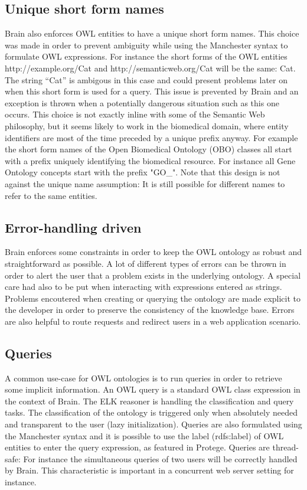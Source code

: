 \documentclass{llncs}
\begin{document}
\subsection{Unique short form names}
Brain also enforces OWL entities to have a unique short form names. This choice was made in order to prevent ambiguity while using 
the Manchester syntax to formulate OWL expressions. For instance the short forms of the OWL entities http://example.org/Cat and
http://semanticweb.org/Cat will be the same: Cat. The string ``Cat'' is ambigous in this case and could present problems later on when this
short form is used for a query.
This issue is prevented by Brain and an exception is thrown 
when a potentially dangerous situation such as this one occurs. 
This choice is not exactly inline with some of the Semantic Web philosophy, but it
seems likely to work in the biomedical domain, where entity identifiers are most of the time preceded by a unique prefix anyway. For example
the short form names of the Open Biomedical Ontology (OBO) classes all start with a prefix uniquely identifying the biomedical resource.
For instance all Gene Ontology concepts start with the prefix "GO\_".
Note that this design is not against the unique name assumption: It is still possible for different names to refer to the same entities.

\subsection{Error-handling driven}
Brain enforces some constraints in order to keep the OWL ontology as robust and straightforward as possible. 
A lot of different types of errors
can be thrown in order to alert the user that a problem exists in the underlying ontology. 
A special care had also to be put when interacting with expressions entered as strings. Problems encoutered when creating or querying
the ontology are made explicit to the developer in order to preserve the consistency of the knowledge base. Errors are also helpful
to route requests and redirect users in a web application scenario.

\subsection{Queries}
A common use-case for OWL ontologies is to run queries in order to retrieve some implicit information. An OWL query is a
standard OWL class expression in the context of Brain. The ELK reasoner is handling the classification and query tasks. The classification
of the ontology is triggered only when absolutely needed and transparent to the user (lazy initialization). Queries are also formulated
using the Manchester syntax and it is possible to use the label (rdfs:label) of OWL entities to enter the query expression, as featured
in Protege. Queries are thread-safe: For instance the simultaneous queries of two users will be correctly handled by Brain.
This characteristic is important in a concurrent web server setting for instance.
\end{document}
